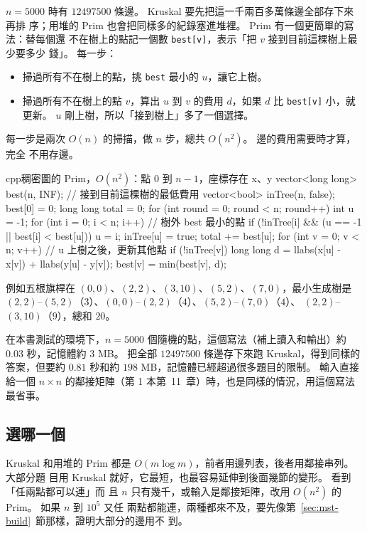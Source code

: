 $n = 5000$ 時有 $12497500$ 條邊。 Kruskal 要先把這一千兩百多萬條邊全部存下來再排
序；用堆的 Prim 也會把同樣多的紀錄塞進堆裡。 Prim 有一個更簡單的寫法：替每個還
不在樹上的點記一個數 \texttt{best[v]}，表示「把 $v$ 接到目前這棵樹上最少要多少
錢」。 每一步：

\begin{itemize}
\item 掃過所有不在樹上的點，挑 \texttt{best} 最小的 $u$，讓它上樹。
\item 掃過所有不在樹上的點 $v$，算出 $u$ 到 $v$ 的費用 $d$，如果 $d$ 比
\texttt{best[v]} 小，就更新。 $u$ 剛上樹，所以「接到樹上」多了一個選擇。
\end{itemize}

每一步是兩次 $O(n)$ 的掃描，做 $n$ 步，總共 $O(n^2)$。 邊的費用需要時才算，完全
不用存邊。

\begin{code}{cpp}{稠密圖的 Prim，$O(n^2)$：點 $0$ 到 $n - 1$，座標存在 x、y}
vector<long long> best(n, INF);         // 接到目前這棵樹的最低費用
vector<bool> inTree(n, false);
best[0] = 0;
long long total = 0;
for (int round = 0; round < n; round++) {
    int u = -1;
    for (int i = 0; i < n; i++) {       // 樹外 best 最小的點
        if (!inTree[i] && (u == -1 || best[i] < best[u])) {
            u = i;
        }
    }
    inTree[u] = true;
    total += best[u];
    for (int v = 0; v < n; v++) {       // u 上樹之後，更新其他點
        if (!inTree[v]) {
            long long d = llabs(x[u] - x[v]) + llabs(y[u] - y[v]);
            best[v] = min(best[v], d);
        }
    }
}
\end{code}

例如五根旗桿在 $(0, 0)$、$(2, 2)$、$(3, 10)$、$(5, 2)$、$(7, 0)$，最小生成樹是
$(2,2)$--$(5,2)$（$3$）、$(0,0)$--$(2,2)$（$4$）、$(5,2)$--$(7,0)$（$4$）、
$(2,2)$--$(3,10)$（$9$），總和 $20$。

在本書測試的環境下，$n = 5000$ 個隨機的點，這個寫法（補上讀入和輸出）約 $0.03$ 秒，記憶體約
$3$ MB。 把全部 $12497500$ 條邊存下來跑 Kruskal，得到同樣的答案，但要約
$0.81$ 秒和約 $198$ MB，記憶體已經超過很多題目的限制。 輸入直接給一個
$n \times n$ 的鄰接矩陣（第 1 本第~11~章）時，也是同樣的情況，用這個寫法最省事。

\subsection{選哪一個}

Kruskal 和用堆的 Prim 都是 $O(m \log m)$，前者用邊列表，後者用鄰接串列。 大部分題
目用 Kruskal 就好，它最短，也最容易延伸到後面幾節的變形。 看到「任兩點都可以連」而
且 $n$ 只有幾千，或輸入是鄰接矩陣，改用 $O(n^2)$ 的 Prim。 如果 $n$ 到 $10^5$ 又任
兩點都能連，兩種都來不及，要先像第~\ref{sec:mst-build}~節那樣，證明大部分的邊用不
到。

